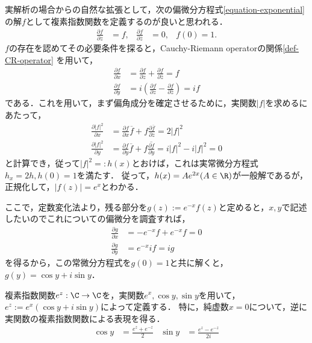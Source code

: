 \documentclass[uplatex, dvipdfmx]{jsreport}
\begin{document}
\begin{discussion}
    実解析の場合からの自然な拡張として，次の偏微分方程式\ref{equation-exponential}
    の解$f$として複素指数関数を定義するのが良いと思われる．
    \begin{align}\label{equation-exponential}
        \frac{\partial f}{\partial z}&=f, &\frac{\partial f}{\partial\overline{z}}&=0,&f(0)=1.
    \end{align}
    $f$の存在を認めてその必要条件を探ると，Cauchy-Riemann operatorの関係\ref{def-CR-operator}
    を用いて，
    \begin{align*}
        \frac{\partial f}{\partial x} &= \frac{\partial f}{\partial z} + \frac{\partial f}{\partial\overline{z}}=f\\
        \frac{\partial f}{\partial y} &= i\left(\frac{\partial f}{\partial z}-\frac{\partial f}{\partial \overline{z}}\right)=if
    \end{align*}
    である．これを用いて，まず偏角成分を確定させるために，実関数$|f|$を求めるにあたって，
    \begin{align*}
        \frac{\partial |f|^2}{\partial x} &= \frac{\partial f}{\partial x}\overline{f}+f\frac{\partial\overline{f}}{\partial z}=2|f|^2\\
        \frac{\partial |f|^2}{\partial y} &= \frac{\partial f}{\partial y}\overline{f}+f\overline{\frac{\partial f}{\partial y}} = i|f|^2-i|f|^2=0
    \end{align*}
    と計算でき，従って$|f|^2=:h(x)$とおけば，これは実常微分方程式$h_x=2h,h(0)=1$を満たす．
    従って，$h(x)=Ae^{2x}(A\in\R)$が一般解であるが，正規化して，$|f(z)|=e^x$とわかる．

    ここで，定数変化法より，残る部分を$g(z):=e^{-x}f(z)$と定めると，$x,y$で記述したいのでこれについての偏微分を調査すれば，
    \begin{align*}
        \frac{\partial g}{\partial x} &= -e^{-x}f + e^{-x}f = 0\\
        \frac{\partial g}{\partial y} &= e^{-x}if = ig
    \end{align*}
    を得るから，この常微分方程式を$g(0)=1$と共に解くと，$g(y)=\cos y+i\sin y$．
\end{discussion}

\begin{definition}\label{def-微分方程式による指数関数の定義}
    複素指数関数$e^z:\C\to\C$を，実関数$e^x,\cos y,\sin y$を用いて，$e^z:=e^x(\cos y+i\sin y)$によって定義する．
    特に，純虚数$x=0$について，逆に実関数の複素指数関数による表現を得る．
    \begin{align*}
        \cos y&=\frac{e^z+e^{-z}}{2} &\sin y&= \frac{e^z-e^{-z}}{2i}
    \end{align*}
\end{definition}
\end{document}
